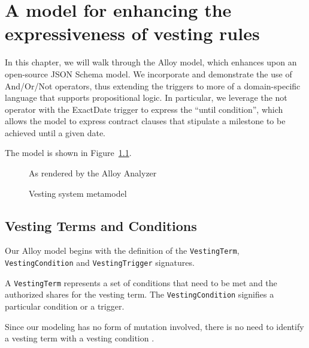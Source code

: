 \chapter{A model for enhancing the expressiveness of vesting rules}\label{ch:vesting-system}

In this chapter, we will walk through the Alloy model, which enhances upon an open-source JSON Schema model. We incorporate and demonstrate the use of And/Or/Not operators, thus extending the triggers to more of a domain-specific language that supports propositional logic. In particular, we leverage the not operator with the ExactDate trigger to express the ``until condition'', which allows the model to express contract clauses that stipulate a milestone to be achieved until a given date.

The model is shown in Figure~\ref{fig:vs-metamodel}.
\begin{figure}[H]
	\centering
	\caption{Vesting system metamodel}\label{fig:vs-metamodel}
	As rendered by the Alloy Analyzer
\end{figure}

\section{Vesting Terms and Conditions}

Our Alloy model begins with the definition of the \verb|VestingTerm|, \verb|VestingCondition| and \verb|VestingTrigger| signatures.

A \verb|VestingTerm| represents a set of conditions that need to be met and the authorized shares for the vesting term. The \verb|VestingCondition| signifies a particular condition or a trigger.

Since our modeling has no form of mutation involved, there is no need to identify a vesting term with a vesting condition .

